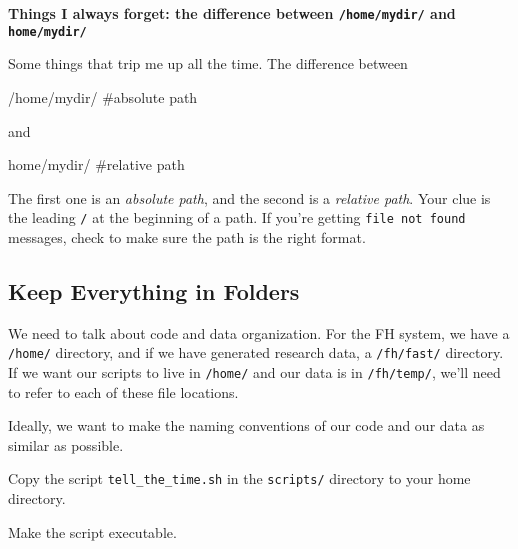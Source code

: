 \documentclass[
  letterpaper,
  DIV=11,
  numbers=noendperiod]{scrreprt}
\newenvironment{Shaded}{\begin{snugshade}}{\end{snugshade}}
\newcommand{\CommentTok}[1]{\textcolor[rgb]{0.37,0.37,0.37}{#1}}
\newcommand{\ExtensionTok}[1]{\textcolor[rgb]{0.00,0.23,0.31}{#1}}
\begin{document}
\begin{tcolorbox}[enhanced jigsaw, breakable, leftrule=.75mm, colframe=quarto-callout-color-frame, left=2mm, toprule=.15mm, arc=.35mm, rightrule=.15mm, opacityback=0, bottomrule=.15mm, colback=white]

\vspace{-3mm}\textbf{Things I always forget: the difference between \texttt{/home/mydir/} and
\texttt{home/mydir/}}\vspace{3mm}

Some things that trip me up all the time. The difference between

\begin{Shaded}
\begin{Highlighting}[]
\ExtensionTok{/home/mydir/}    \CommentTok{\#absolute path}
\end{Highlighting}
\end{Shaded}

and

\begin{Shaded}
\begin{Highlighting}[]
\ExtensionTok{home/mydir/}     \CommentTok{\#relative path}
\end{Highlighting}
\end{Shaded}

The first one is an \emph{absolute path}, and the second is a
\emph{relative path}. Your clue is the leading \texttt{/} at the
beginning of a path. If you're getting \texttt{file\ not\ found}
messages, check to make sure the path is the right format.

\end{tcolorbox}

\subsection{Keep Everything in
Folders}\label{keep-everything-in-folders}

We need to talk about code and data organization. For the FH system, we
have a \texttt{/home/} directory, and if we have generated research
data, a \texttt{/fh/fast/} directory. If we want our scripts to live in
\texttt{/home/} and our data is in \texttt{/fh/temp/}, we'll need to
refer to each of these file locations.

Ideally, we want to make the naming conventions of our code and our data
as similar as possible.

\begin{tcolorbox}[enhanced jigsaw, colbacktitle=quarto-callout-note-color!10!white, left=2mm, toprule=.15mm, toptitle=1mm, opacityback=0, bottomrule=.15mm, breakable, leftrule=.75mm, colframe=quarto-callout-note-color-frame, bottomtitle=1mm, titlerule=0mm, coltitle=black, title=\textcolor{quarto-callout-note-color}{\faInfo}\hspace{0.5em}{Try it Out}, rightrule=.15mm, arc=.35mm, opacitybacktitle=0.6, colback=white]

Copy the script \texttt{tell\_the\_time.sh} in the \texttt{scripts/}
directory to your home directory.

Make the script executable.

\end{tcolorbox}
\end{document}
